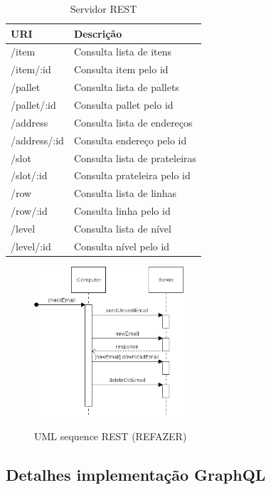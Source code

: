 \begin{table}
    \centering
    \begin{tabular}{| l | l |}
        \hline
        \textbf{URI} & \textbf{Descrição} \\ \hline
        /item & Consulta lista de itens \\ \hline
        /item/:id & Consulta item pelo id \\ \hline
        /pallet & Consulta lista de pallets  \\ \hline
        /pallet/:id & Consulta pallet pelo id  \\ \hline
        /address & Consulta lista de endereços \\ \hline
        /address/:id & Consulta endereço pelo id \\ \hline
        /slot & Consulta lista de prateleiras \\ \hline
        /slot/:id & Consulta prateleira pelo id \\ \hline
        /row & Consulta lista de linhas \\ \hline
        /row/:id & Consulta linha pelo id \\ \hline
        /level & Consulta lista de nível \\ \hline
        /level/:id & Consulta nível pelo id \\ \hline
    \end{tabular}
    \caption{Servidor REST} \label{tab:rest-url}
\end{table}

\begin{figure}[htbp]
\centering
\includegraphics[width=0.5\textwidth]{figuras/uml-sequence.png}
\label{fig:rest-uml}
\caption{UML sequence REST (REFAZER)}
\author{fonte: Autor}
\end{figure}
\pagebreak

\subsection{Detalhes implementação GraphQL}

